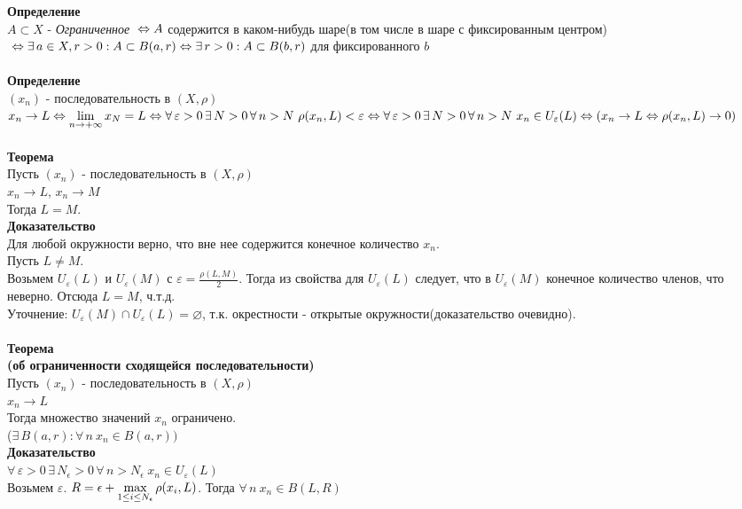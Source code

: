\documentclass[12pt]{article}
\begin{document}
\textbf{Определение}\\
$A \subset X$ - \textit{Ограниченное} $\\\Leftrightarrow A$ содержится в каком-нибудь шаре(в том числе в шаре с фиксированным центром) $\\\Leftrightarrow \exists\,a\in X, r>0: A \subset B(a,r) \\\Leftrightarrow \exists\,r > 0: A\subset B(b,r)$ для фиксированного $b$\\\\
\textbf{Определение}\\
$(x_n)$ - последовательность в $(X,\rho)$\\
$x_n\rightarrow L \\\Leftrightarrow \liml_{n\rightarrow +\infty}{x_N} = L
\\\Leftrightarrow \forall\,\varepsilon>0\,\exists\,N>0\,\forall\,n>N\ \rho(x_n,L)<\varepsilon
\\\Leftrightarrow \forall\,\varepsilon>0\,\exists\,N>0\,\forall\,n>N\ x_n \in U_\varepsilon(L)
\\\Leftrightarrow (x_n\rightarrow L \Leftrightarrow \rho(x_n,L)\rightarrow 0)$\\\\
\textbf{Теорема}\\
Пусть $(x_n)$ - последовательность в $(X,\rho)$\\
$x_n\rightarrow L$, $x_n\rightarrow M$\\
Тогда $L=M$.\\
\textbf{Доказательство}\\
Для любой окружности верно, что вне нее содержится конечное количество $x_n$.\\
Пусть $L\neq M$.\\
Возьмем $U_\varepsilon(L)$ и $U_\varepsilon(M)$ с $\varepsilon = \frac{\rho(L,M)}{2}$. Тогда из свойства для $U_\varepsilon(L)$ следует, что в $U_\varepsilon(M)$ конечное количество членов, что неверно. Отсюда $L=M$, ч.т.д.\\
Уточнение: $U_\varepsilon(M) \cap U_\varepsilon(L) = \varnothing$, т.к. окрестности - открытые окружности(доказательство очевидно).\\\\
\textbf{Теорема\\(об ограниченности сходящейся последовательности)}\\
Пусть $(x_n)$ - последовательность в $(X,\rho)$\\
$x_n\rightarrow L$\\
Тогда множество значений $x_n$ ограничено.\\
($\exists\,B(a,r): \forall\,n\ x_n\in B(a,r))$\\
\textbf{Доказательство}\\
$\forall\,\varepsilon>0\,\exists\,N_\epsilon>0\,\forall\,n>N_\epsilon\ x_n \in U_\varepsilon(L)$\\
Возьмем $\varepsilon$. $R = \epsilon+\max\limits_{1 \leq i \leq N_\epsilon}{\rho(x_i,L)}$. Тогда $\forall\,n\ x_n\in B(L,R)$\\\\
\end{document}
